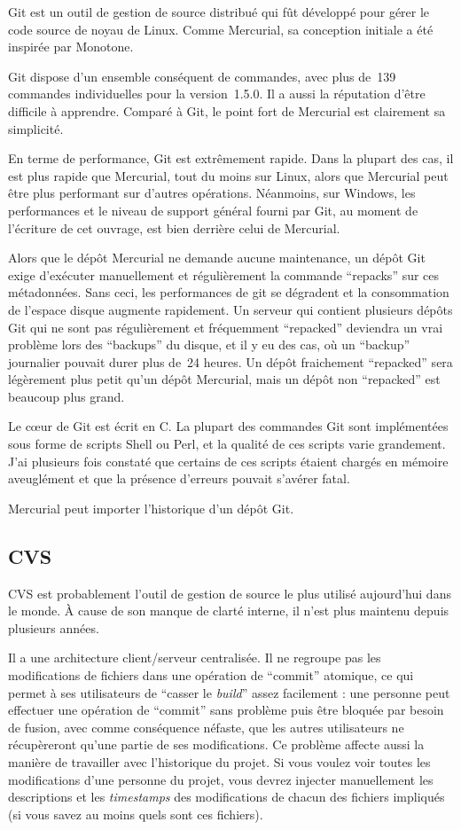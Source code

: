 Git est un outil de gestion de source distribué qui fût développé pour gérer
le code source de noyau de Linux. Comme Mercurial, sa conception initiale a 
été inspirée par Monotone.

Git dispose d'un ensemble conséquent de commandes, avec plus de~139 commandes
individuelles pour la version~1.5.0. Il a aussi la réputation d'être difficile
à apprendre. Comparé à Git, le point fort de Mercurial est clairement sa 
simplicité.

En terme de performance, Git est extrêmement rapide. Dans la plupart des
cas, il est plus rapide que Mercurial, tout du moins sur Linux, alors que 
Mercurial peut être plus performant sur d'autres opérations. Néanmoins, sur
Windows, les performances et le niveau de support général fourni par Git, 
au moment de l'écriture de cet ouvrage, est bien derrière celui de Mercurial.

Alors que le dépôt Mercurial ne demande aucune maintenance, un dépôt Git
exige d'exécuter manuellement et régulièrement la commande ``repacks'' sur
ces métadonnées. Sans ceci, les performances de git se dégradent et la 
consommation de l'espace disque augmente rapidement. Un serveur qui contient
plusieurs dépôts Git qui ne sont pas régulièrement et fréquemment ``repacked''
deviendra un vrai problème lors des ``backups'' du disque, et il y eu des
cas, où un ``backup'' journalier pouvait durer plus de~24 heures. Un dépôt
fraichement ``repacked'' sera légèrement plus petit qu'un dépôt Mercurial,
mais un dépôt non ``repacked'' est beaucoup plus grand.

Le cœur de Git est écrit en C. La plupart des commandes Git sont implémentées
sous forme de scripts Shell ou Perl, et la qualité de ces scripts varie
grandement. J'ai plusieurs fois constaté que certains de ces scripts étaient
chargés en mémoire aveuglément et que la présence d'erreurs pouvait s'avérer
fatal.

Mercurial peut importer l'historique d'un dépôt Git.

\subsection{CVS}

CVS est probablement l'outil de gestion de source le plus utilisé aujourd'hui
dans le monde. À cause de son manque de clarté interne, il n'est plus 
maintenu depuis plusieurs années.

Il a une architecture client/serveur centralisée. Il ne regroupe pas les
modifications de fichiers dans une opération de ``commit'' atomique, ce
qui permet à ses utilisateurs de ``casser le \textit{build}'' assez
facilement : une personne peut effectuer une opération de ``commit'' 
sans problème puis être bloquée par besoin de fusion, avec comme conséquence
néfaste, que les autres utilisateurs ne récupèreront qu'une partie de ses
modifications. Ce problème affecte aussi la manière de travailler avec 
l'historique du projet. Si vous voulez voir toutes les modifications d'une
personne du projet, vous devrez injecter manuellement les descriptions et les
\textit{timestamps} des modifications de chacun des fichiers impliqués (si
vous savez au moins quels sont ces fichiers).


